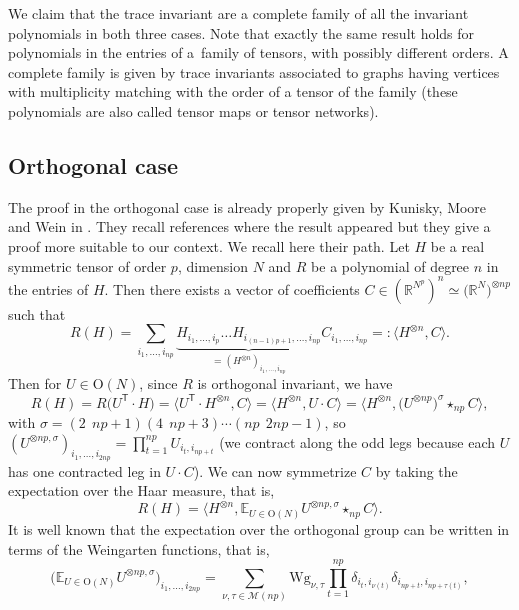 \documentclass[pdftex]{sigma}
\numberwithin{equation}{section}
\theoremstyle{definition}
\begin{document}
We claim that the trace invariant are a complete family of all the invariant polynomials in both three cases. Note that exactly the same result holds for polynomials in the entries of a~family of tensors, with possibly different orders. A complete family is given by trace invariants associated to graphs having vertices with multiplicity matching with the order of a tensor of the family (these polynomials are also called tensor maps or tensor networks).

\subsection{Orthogonal case}

The proof in the orthogonal case is already properly given by Kunisky, Moore and Wein in \cite[Appendix A]{kunmoorewein}. They recall references where the result appeared \cite{goodmanwallach,wey66} but they give a proof more suitable to our context. We recall here their path. Let $H$ be a real symmetric tensor of order $p$, dimension $N$ and $R$ be a polynomial of degree $n$ in the entries of $H$. Then there exists a vector of coefficients $C \in (\mathbb{R}^{N^p})^{n}\simeq\bigl(\mathbb{R}^N\bigr)^{\otimes np}$ such that
\[R(H)= \sum_{i_1,\dots,i_{np}} \underbrace{H_{i_1,\dots,i_p}\dots H_{i_{(n-1)p+1},\dots,i_{np}}}_{=(H^{\otimes n})_{i_1,\dots,i_{np}}} C_{i_1,\dots,i_{np}} =: \big\langle H^{\otimes n}, C \big\rangle. \]
Then for $U \in \mathrm{O}(N)$, since $R$ is orthogonal invariant, we have
\[ R(H) = R\bigl(U^{\mathsf T} \cdot H\bigr)= \big\langle U^{\mathsf T} \cdot H^{\otimes n}, C \big\rangle = \big\langle H^{\otimes n}, U \cdot C \big\rangle = \big\langle H^{\otimes n}, \bigl(U^{\otimes np}\bigr)^{\sigma} \star_{np} C \big\rangle, \]
with $\sigma = (2 \ \ np+1)(4 \ \ np+3)\cdots (np \ \ 2np-1)$, so $(U^{\otimes np, \sigma})_{i_1,\dots,i_{2np}}=\prod_{t=1}^{np} U_{i_t,i_{np+t}} $ (we contract along the odd legs because each $U$ has one contracted leg in $U \cdot C$). We can now symmetrize $C$ by taking the expectation over the Haar measure, that is,
\[ R(H) = \big\langle H^{\otimes n}, \mathbb{E}_{U \in \mathrm{O}(N)} U^{\otimes np, \sigma} \star_{np} C \big\rangle. \]
It is well known \cite{collinssniady04,weingarten} that the expectation over the orthogonal group can be written in terms of the Weingarten functions, that is,
\[ \bigl(\mathbb{E}_{U \in \mathrm{O}(N)} U^{\otimes np, \sigma}\bigr)_{i_1,\dots,i_{2np}} = \sum_{\nu,\tau \in \mathcal{M}(np)} \mathrm{Wg}_{\nu,\tau} \prod_{t=1}^{np} \delta_{i_t,i_{\nu(t)}} \delta_{i_{np+t},i_{np+\tau(t)}}, \]
\end{document}
